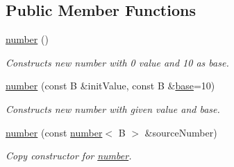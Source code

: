 \subsection*{Public Member Functions}
\begin{DoxyCompactItemize}
\item 
\hypertarget{classcjr_1_1number_a96952d8729d8a96590b5cfa4de8c94f9}{\hyperlink{classcjr_1_1number_a96952d8729d8a96590b5cfa4de8c94f9}{number} ()}\label{classcjr_1_1number_a96952d8729d8a96590b5cfa4de8c94f9}

\begin{DoxyCompactList}\small\item\em Constructs new number with 0 value and 10 as base. \end{DoxyCompactList}\item 
\hyperlink{classcjr_1_1number_aeaf08725e9ae255c3ee25045bbd235f1}{number} (const B \&init\-Value, const B \&\hyperlink{classcjr_1_1number_abb42f009bce42f2050a7bd66e029b931}{base}=10)
\begin{DoxyCompactList}\small\item\em Constructs new number with given value and base. \end{DoxyCompactList}\item 
\hyperlink{classcjr_1_1number_aa3ab519d30cba11bfec2177c2b429b8f}{number} (const \hyperlink{classcjr_1_1number}{number}$<$ B $>$ \&source\-Number)
\begin{DoxyCompactList}\small\item\em Copy constructor for \hyperlink{classcjr_1_1number}{number}. \end{DoxyCompactList}\end{DoxyCompactItemize}

